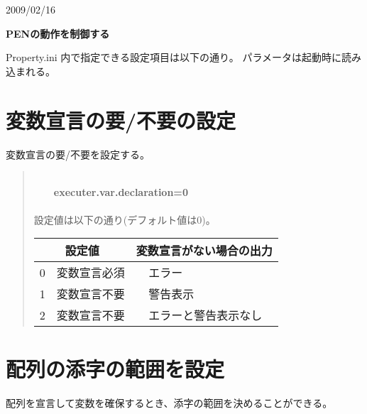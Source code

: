 \documentclass[10pt,a4j]{jarticle}
\begin{document}
\noindent
\begin{flushright}
{\small	2009/02/16}
\end{flushright}
\begin{center}
\begin{LARGE}
{\bf{PENの動作を制御する}}
\end{LARGE}
\end{center}

Property.ini 内で指定できる設定項目は以下の通り。
パラメータは起動時に読み込まれる。

\section{変数宣言の要/不要の設定}

変数宣言の要/不要を設定する。

\begin{quotation}

\noindent [使用例]\\
~~~~{\bf{executer.var.declaration=0}}\\
\ \\ 
設定値は以下の通り(デフォルト値は0)。\\

\begin{tabular}{c|l||cl}
\hline
\multicolumn{2}{c||}{設定値} & \multicolumn{2}{c}{変数宣言がない場合の出力}\\
\hline
0 & 変数宣言必須 &  & エラー \\
\hline
1 & 変数宣言不要 &  & 警告表示 \\
\hline
2 & 変数宣言不要 &  & エラーと警告表示なし \\
\hline
\end{tabular}

\end{quotation}

\section{配列の添字の範囲を設定}
配列を宣言して変数を確保するとき、添字の範囲を決めることができる。
\end{document}
